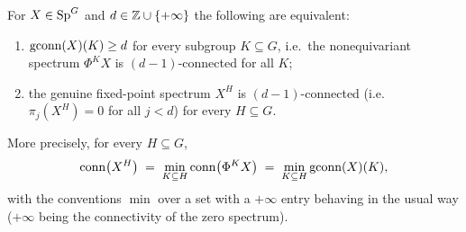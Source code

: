\begin{qfivelemma}\label{lem:detect-conn}
For $X\in\mathrm{Sp}^G$ and $d\in\mathbb{Z}\cup\{+\infty\}$ the following are equivalent:
\begin{enumerate}\setlength\itemsep{2pt}
\item $\operatorname{gconn}(X)(K)\ge d$ for every subgroup $K\subseteq G$, i.e.\ the
nonequivariant spectrum $\Phi^K X$ is $(d-1)$-connected for all $K$;
\item the genuine fixed-point spectrum $X^H$ is $(d-1)$-connected
(i.e.\ $\pi_j(X^H)=0$ for all $j<d$) for every $H\subseteq G$.
\end{enumerate}
More precisely, for every $H\subseteq G$,
\begin{equation}\label{eq:conn-min}
\operatorname{conn}\bigl(X^H\bigr)\;=\;\min_{K\subseteq H}\operatorname{conn}\bigl(\Phi^K X\bigr)
\;=\;\min_{K\subseteq H}\operatorname{gconn}(X)(K),
\end{equation}
with the conventions $\min$ over a set with a $+\infty$ entry behaving in the
usual way ($+\infty$ being the connectivity of the zero spectrum).
\end{qfivelemma}

